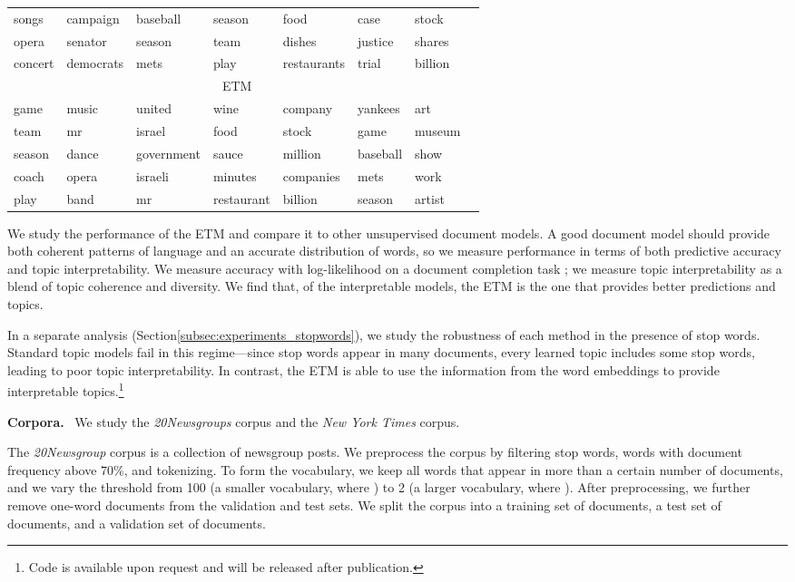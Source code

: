 \documentclass[11pt,a4paper]{article}
\DeclareRobustCommand{\parhead}[1]{\noindent\textbf{#1}~}
\begin{document}
\begin{table*}[t]
\begin{tabular}{llllllll}
     songs & campaign & baseball & season & food &  case & stock \\
     opera & senator & season & team & dishes &  justice & shares \\
     concert & democrats & mets & play & restaurants &  trial & billion  \\
\midrule 
\multicolumn{7}{c}{\gls{ETM}}\\
\hline
     game & music & united & wine & company & yankees &  art\\
     team & mr & israel & food & stock & game & museum    \\
     season & dance & government & sauce &  million & baseball & show \\
     coach & opera & israeli & minutes & companies & mets &  work \\
     play &  band & mr &  restaurant & billion &  season & artist  \\
 \bottomrule
 \end{tabular}
\label{tab:topics}
\end{table*}

We study the performance of the \gls{ETM} and compare it to other
unsupervised document models.  A good document model should provide
both coherent patterns of language and an accurate distribution of
words, so we measure performance in terms of both predictive accuracy
and topic interpretability.  We measure accuracy with log-likelihood
on a document completion task \citep{rosenzvi2004author,wallach2009evaluation};
we measure topic interpretability as a
blend of topic coherence and diversity.  We find that, of the interpretable
models, the \gls{ETM} is the one that provides better predictions and
topics.

In a separate analysis (Section\nobreakspace \ref {subsec:experiments_stopwords}), we study
the robustness of each method in the presence of stop words. Standard
topic models fail in this regime---since stop words appear in many documents,
every learned topic includes some stop words, leading to poor topic
interpretability.
In contrast, the \gls{ETM} is able to use the information from the word
embeddings to provide interpretable topics.\footnote{Code is available upon request and will be released after publication.}

\parhead{Corpora.} We study the \emph{20Newsgroups} corpus and the
\emph{New York Times} corpus.

The \emph{20Newsgroup} corpus is a collection of newsgroup posts. We
preprocess the corpus by filtering stop words, words with document
frequency above 70\%, and tokenizing.  To form the vocabulary, we keep
all words that appear in more than a certain number of documents, and
we vary the threshold from 100 (a smaller vocabulary, where
) to 2 (a larger vocabulary, where ). After
preprocessing, we further remove one-word documents from the
validation and test sets.
We split the corpus into a training set of  documents, a test
set of  documents, and a validation set of  documents.
\end{document}
